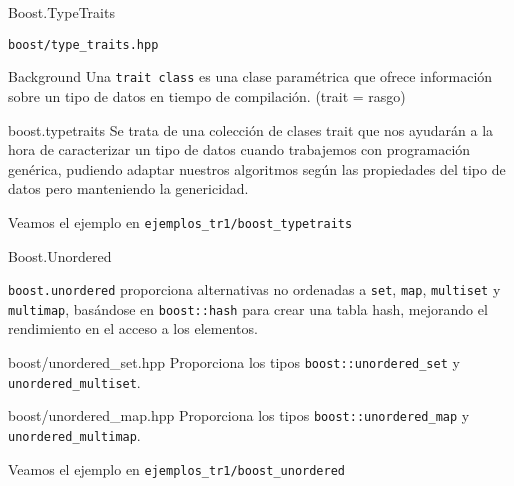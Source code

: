 \documentclass[8pt,xcolor=svgnames]{beamer}
\begin{document}
\begin{frame}{Boost.TypeTraits}
  \begin{block}{}
    \texttt{boost/type\_traits.hpp}
  \end{block}
  \begin{block}{Background}
    Una \texttt{trait class} es una clase paramétrica que ofrece información
    sobre un tipo de datos en tiempo de compilación. (trait = rasgo)
  \end{block}
  \pause
  \begin{block}{boost.typetraits}
    Se trata de una colección de clases trait que nos ayudarán a la
    hora de caracterizar un tipo de datos cuando trabajemos con
    programación genérica, pudiendo adaptar nuestros algoritmos según
    las propiedades del tipo de datos pero manteniendo la genericidad.
  \end{block}
  \pause
  \begin{block}{}
    Veamos el ejemplo en \texttt{ejemplos\_tr1/boost\_typetraits}
  \end{block}  
\end{frame}


\begin{frame}{Boost.Unordered}
  \begin{block}{}
    \texttt{boost.unordered} proporciona alternativas no ordenadas a
    \texttt{set}, \texttt{map}, \texttt{multiset} y \texttt{multimap},
    basándose en \texttt{boost::hash} para crear una tabla hash,
    mejorando el rendimiento en el acceso a los elementos.
  \end{block}
  \pause
  \begin{block}{boost/unordered\_set.hpp}
    Proporciona los tipos \texttt{boost::unordered\_set} y
    \texttt{unordered\_multiset}.
  \end{block}
  \pause
  \begin{block}{boost/unordered\_map.hpp}
    Proporciona los tipos \texttt{boost::unordered\_map} y
    \texttt{unordered\_multimap}.
  \end{block}
  \pause
  \begin{block}{}
    Veamos el ejemplo en \texttt{ejemplos\_tr1/boost\_unordered}
  \end{block}  
\end{frame}
\end{document}
